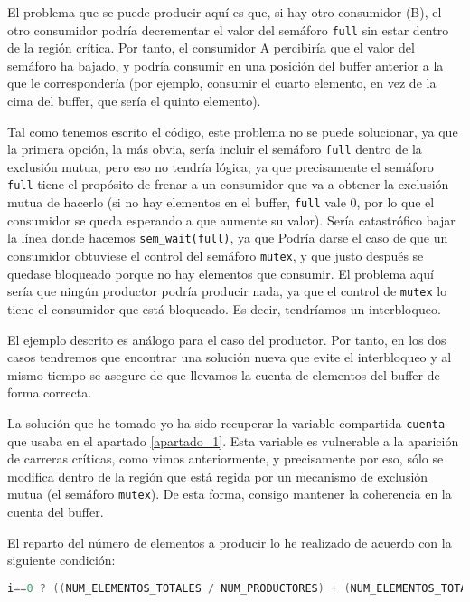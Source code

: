 \documentclass[a4paper]{article}
\begin{document}
El problema que se puede producir aquí es que, si hay otro consumidor (B), el otro consumidor podría decrementar el valor del semáforo \texttt{full} sin estar dentro de la región crítica. Por tanto, el consumidor A percibiría que el valor del semáforo ha bajado, y podría consumir en una posición del buffer anterior a la que le correspondería (por ejemplo, consumir el cuarto elemento, en vez de la cima del buffer, que sería el quinto elemento).

Tal como tenemos escrito el código, este problema no se puede solucionar, ya que la primera opción, la más obvia, sería incluir el semáforo \texttt{full} dentro de la exclusión mutua, pero eso no tendría lógica, ya que precisamente el semáforo \texttt{full} tiene el propósito de frenar a un consumidor que va a obtener la exclusión mutua de hacerlo (si no hay elementos en el buffer, \texttt{full} vale 0, por lo que el consumidor se queda esperando a que aumente su valor). Sería catastrófico bajar la línea donde hacemos \texttt{sem\_wait(full)}, ya que Podría darse el caso de que un consumidor obtuviese el control del semáforo \texttt{mutex}, y que justo después se quedase bloqueado porque no hay elementos que consumir. El problema aquí sería que ningún productor podría producir nada, ya que el control de \texttt{mutex} lo tiene el consumidor que está bloqueado. Es decir, tendríamos un interbloqueo.

El ejemplo descrito es análogo para el caso del productor. Por tanto, en los dos casos tendremos que encontrar una solución nueva que evite el interbloqueo y al mismo tiempo se asegure de que llevamos la cuenta de elementos del buffer de forma correcta.

La solución que he tomado yo ha sido recuperar la variable compartida \texttt{cuenta} que usaba en el apartado \ref{apartado_1}. Esta variable es vulnerable a la aparición de carreras críticas, como vimos anteriormente, y precisamente por eso, sólo se modifica dentro de la región que está regida por un mecanismo de exclusión mutua (el semáforo \texttt{mutex}). De esta forma, consigo mantener la coherencia en la cuenta del buffer.

El reparto del número de elementos a producir lo he realizado de acuerdo con la siguiente condición:

\begin{lstlisting}[language=C]
    i==0 ? ((NUM_ELEMENTOS_TOTALES / NUM_PRODUCTORES) + (NUM_ELEMENTOS_TOTALES % NUM_PRODUCTORES)) : (NUM_ELEMENTOS_TOTALES / NUM_PRODUCTORES)
\end{lstlisting}
\end{document}
